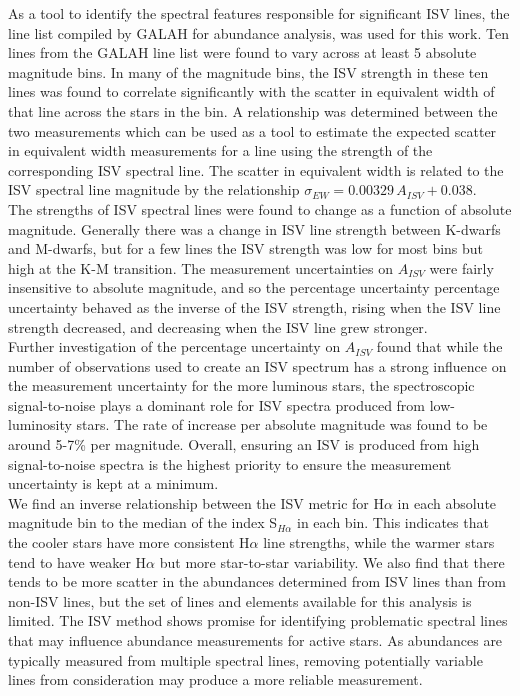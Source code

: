 As a tool to identify the spectral features responsible for significant ISV lines, the line list compiled by GALAH for abundance analysis, was used for this work. Ten lines from the GALAH line list were found to vary across at least 5 absolute magnitude bins. In many of the magnitude bins, the ISV strength in these ten lines was found to correlate significantly with the scatter in equivalent width of that line across the stars in the bin. A relationship was determined between the two measurements which can be used as a tool to estimate the expected scatter in equivalent width measurements for a line using the strength of the corresponding ISV spectral line. The scatter in equivalent width is related to the ISV spectral line magnitude by the relationship $\sigma_{EW} = 0.00329\,A_{ISV} + 0.038$.\\

The strengths of ISV spectral lines were found to change as a function of absolute magnitude. Generally there was a change in ISV line strength between K-dwarfs and M-dwarfs, but for a few lines the ISV strength was low for most bins but high at the K-M transition. The measurement uncertainties on $A_{ISV}$ were fairly insensitive to absolute magnitude, and so the percentage uncertainty percentage uncertainty behaved as the inverse of the ISV strength, rising when the ISV line strength decreased, and decreasing when the ISV line grew stronger.\\ 

Further investigation of the percentage uncertainty on $A_{ISV}$ found that while the number of observations used to create an ISV spectrum has a strong influence on the measurement uncertainty for the more luminous stars, the spectroscopic signal-to-noise plays a dominant role for ISV spectra produced from low-luminosity stars. The rate of increase per absolute magnitude was found to be around 5-7\% per magnitude. Overall, ensuring an ISV is produced from high signal-to-noise spectra is the highest priority to ensure the measurement uncertainty is kept at a minimum.\\

We find an inverse relationship between the ISV metric for H$\alpha$ in each absolute magnitude bin to the median of the index S$_{H\alpha}$ in each bin. This indicates that the cooler stars have more consistent H$\alpha$ line strengths, while the warmer stars tend to have weaker H$\alpha$ but more star-to-star variability. We also find that there tends to be more scatter in the abundances determined from ISV lines than from non-ISV lines, but the set of lines and elements available for this analysis is limited. The ISV method shows promise for identifying problematic spectral lines that may influence abundance measurements for active stars. As abundances are typically measured from multiple spectral lines, removing potentially variable lines from consideration may produce a more reliable measurement.